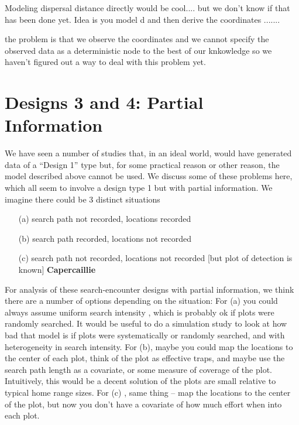 Modeling dispersal distance directly would be cool.... but we don't
know if that has been done yet.
Idea is you model d and then derive the coordinates .......

the problem is that we observe the coordinates and we cannot specify
the observed data as a deterministic node to the best of our
knkowledge so we haven't figured out a way to deal with this problem
yet.



\section{Designs 3 and 4: Partial Information}

We have seen a number of studies that, in an ideal world, would have
generated data of a ``Design
1'' type but, for some practical reason or other reason, the model described
above cannot be used.
 We discuss some of these problems here, which all seem to involve a
 design type 1 but with partial information. We imagine there could be
 3 distinct situations
\begin{itemize}
\item[(a)] search path not recorded, locations recorded
\item[(b)] search path recorded, locations not recorded
\item[(c)] search path not recorded, locations not recorded [but plot of
detection is known]  {\bf Capercaillie}
\end{itemize}

For analysis of these search-encounter designs with partial information,
we think there are a number of options depending on the situation:
For (a) you could always assume uniform search intensity ,
which is probably ok if plots were randomly searched.
It would be useful to do a simulation study to look at how bad that
model is if plots were systematically or randomly searched, and with
heterogeneity in search intensity.
For (b), maybe you could map the locations to the center of each plot,
think of the plot as effective traps, and maybe use the search path
length as a covariate, or some measure of coverage of the
plot. Intuitively, this would be a decent solution of the plots are
small relative to typical home range sizes.
For (c) , same thing -- map the locations to the center of the plot,
but now you don't have a covariate of how much effort when into each
plot.

